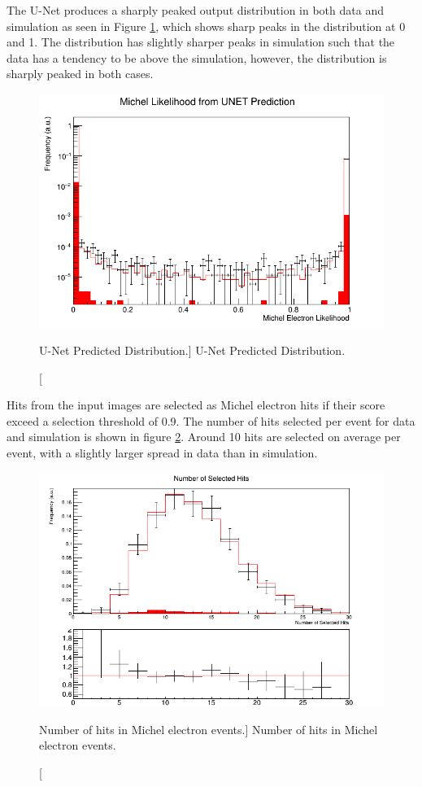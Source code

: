 The U-Net produces a sharply peaked output distribution in both data and
simulation as seen in Figure \ref{fig:unet_pred_data}, which shows sharp peaks
in the distribution at 0 and 1. The distribution has slightly sharper peaks in 
simulation such that the data has a tendency to be above the simulation,
however, the distribution is sharply peaked in both cases.
\begin{figure}
	\centering
	\includegraphics[width=\textwidth]{figures/unet_pred_data.png}
	\caption
	[U-Net Predicted Distribution.]
	{U-Net Predicted Distribution.}
	\label{fig:unet_pred_data}
\end{figure}

Hits from the input images are selected as Michel electron hits if their score
exceed a selection threshold of 0.9. The number of hits selected per event for
data and simulation is shown in figure \ref{fig:mich_n_hits}. Around 10 hits are
selected on average per event, with a slightly larger spread in data than in
simulation.
\begin{figure}
	\centering
	\includegraphics[width=\textwidth]{figures/mich_n_hits.png}
	\caption
	[Number of hits in Michel electron events.]
	{Number of hits in Michel electron events.}
	\label{fig:mich_n_hits}
\end{figure}

